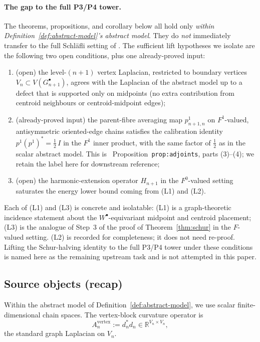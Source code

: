 \documentclass[11pt]{article}
\theoremstyle{plain}
\theoremstyle{definition}
\theoremstyle{remark}
\newcommand{\R}{\mathbb{R}}
\begin{document}
\paragraph*{The gap to the full P3/P4 tower.}
The theorems, propositions, and corollary below all hold only
\emph{within Definition~\ref{def:abstract-model}'s abstract model}. They do
\emph{not} immediately transfer to the full Schl\"{a}fli setting of
\cite{CascadeRefinementSpaces}. The sufficient lift hypotheses we
isolate are the following two open conditions, plus one already-proved
input:
\begin{enumerate}[label=\textup{(L\arabic*)}, leftmargin=2.4em, nosep, topsep=2pt]
\item (open) the level-$(n+1)$ vertex Laplacian, restricted to
  boundary vertices $V_n \subset V(G_{n+1}^{\bullet})$, agrees
  with the Laplacian of the abstract model up to a defect that is
  supported only on midpoints (no extra contribution from centroid
  neighbours or centroid-midpoint edges);
\item (already-proved input) the parent-fibre averaging map
  $p^{1}_{n+1, n}$ on $F^{1}$-valued, antisymmetric oriented-edge
  chains satisfies the calibration identity
  $p^{1}(p^{1})^{*} = \tfrac12 \, I$ in the $F^{1}$ inner product,
  with the same factor of $\tfrac12$ as in the scalar abstract
  model. This is \cite{CascadeRefinementSpaces}~Proposition~\texttt{prop:adjoints},
  parts (3)--(4); we retain the label here for downstream reference;
\item (open) the harmonic-extension operator $H_{n+1}$ in the
  $F^{0}$-valued setting saturates the energy lower bound coming
  from \textup{(L1)} and \textup{(L2)}.
\end{enumerate}
Each of (L1) and (L3) is concrete and isolatable: (L1) is a
graph-theoretic incidence statement about the
$W^{\bullet}$-equivariant midpoint and centroid placement; (L3) is
the analogue of Step~3 of the proof of Theorem~\ref{thm:schur} in
the $F$-valued setting. (L2) is recorded for completeness; it does
not need re-proof. Lifting the Schur-halving identity to the full
P3/P4 tower under these conditions is named here as the remaining
upstream task and is not
attempted in this paper.

\subsection{Source objects (recap)}

Within the abstract model of Definition~\ref{def:abstract-model}, we
use scalar finite-dimensional chain spaces. The vertex-block
curvature operator is
\begin{equation}\label{eq:Anvertex}
   A_n^{\mathrm{vertex}} := d_n^{*} d_n \in \R^{V_n \times V_n},
\end{equation}
the standard graph Laplacian on $V_n$.
\end{document}
